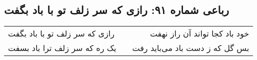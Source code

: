 \begin{center}
\section*{رباعی شماره ۹۱: رازی که سر زلف تو با باد بگفت}
\label{sec:sh091}
\begin{longtable}{l p{0.5cm} r}
رازی که سر زلف تو با باد بگفت
&&
خود باد کجا تواند آن راز نهفت
\\
یک ره که سر زلف ترا باد بسفت
&&
بس گل که ز دست باد می‌باید رفت
\\
\end{longtable}
\end{center}
